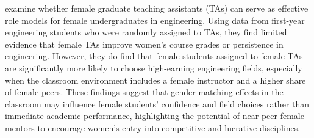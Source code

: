  \citet{griffith_role_2021} examine whether female graduate teaching assistants (TAs) can serve as effective role models for female undergraduates in engineering. Using data from first-year engineering students who were randomly assigned to TAs, they find limited evidence that female TAs improve women’s course grades or persistence in engineering. However, they do find that female students assigned to female TAs are significantly more likely to choose high-earning engineering fields, especially when the classroom environment includes a female instructor and a higher share of female peers. These findings suggest that gender-matching effects in the classroom may influence female students’ confidence and field choices rather than immediate academic performance, highlighting the potential of near-peer female mentors to encourage women’s entry into competitive and lucrative disciplines.





